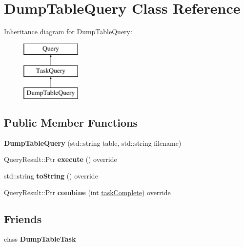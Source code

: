 \hypertarget{class_dump_table_query}{}\section{Dump\+Table\+Query Class Reference}
\label{class_dump_table_query}
Inheritance diagram for Dump\+Table\+Query\+:\begin{figure}[H]
\begin{center}
\leavevmode
\includegraphics[height=3.000000cm]{class_dump_table_query}
\end{center}
\end{figure}
\subsection*{Public Member Functions}
\begin{DoxyCompactItemize}
\item 
\mbox{\label{class_dump_table_query_a0d5ee4ef52e21cbc7cb87bc4153ce43a}} 
{\bfseries Dump\+Table\+Query} (std\+::string table, std\+::string filename)
\item 
\mbox{\label{class_dump_table_query_a6717d017981e962930a0951b3c519f68}} 
Query\+Result\+::\+Ptr {\bfseries execute} () override
\item 
\mbox{\label{class_dump_table_query_a4047a2abe9bd6322c9a68bf1c4fb1476}} 
std\+::string {\bfseries to\+String} () override
\item 
\mbox{\label{class_dump_table_query_a0e379595f545ff2cc2fed17763bf0f86}} 
Query\+Result\+::\+Ptr {\bfseries combine} (int \hyperlink{class_task_query_a3dc3e4c56ddea8ff025239fd9da358d3}{task\+Complete}) override
\end{DoxyCompactItemize}
\subsection*{Friends}
\begin{DoxyCompactItemize}
\item 
\mbox{\label{class_dump_table_query_a790c02b26168b984552211bd81cf2305}} 
class {\bfseries Dump\+Table\+Task}
\end{DoxyCompactItemize}
